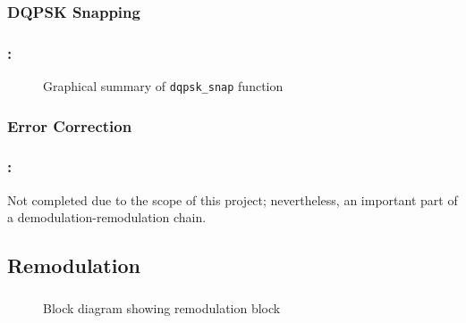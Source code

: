 \documentclass[class=beamer,10pt,crop=false]{standalone}
\begin{document}
\subsubsection{DQPSK Snapping}
    
      

\begin{frame}
    \label{slide:dab-proc_dqpsk-snap}
    \frametitle{\subsecname : \subsubsecname}
    
    \begin{figure}[htbp]
        \centering
        \captionsetup{type=figure}
        \def\svgwidth{\linewidth}
        {\linespread{0.8}
            \scriptsize
            }
        \caption{Graphical summary of \texttt{dqpsk\_snap} function}
        \label{fig:dqpsk_snap}
      \end{figure}
      
\end{frame}
    
\subsubsection{Error Correction}
\begin{frame}
    \label{slide:dab-proc_error-correct}
    \frametitle{\subsecname : \subsubsecname}
        
    Not completed due to the scope of this project; nevertheless, an important part of a demodulation-remodulation chain.
        
\end{frame}


\subsection{Remodulation}
\begin{frame}
    \label{slide:dab-proc_remod}
    \frametitle{\subsecname}
    
    \begin{figure}[htbp]
        \centering
        \captionsetup{type=figure}
        \def\svgwidth{\linewidth}
        {\linespread{0.8}
            \scriptsize
            }
        \caption{Block diagram showing remodulation block}
        \label{fig:BD_Demod_All}
      \end{figure}
      
\end{frame}
\end{document}

